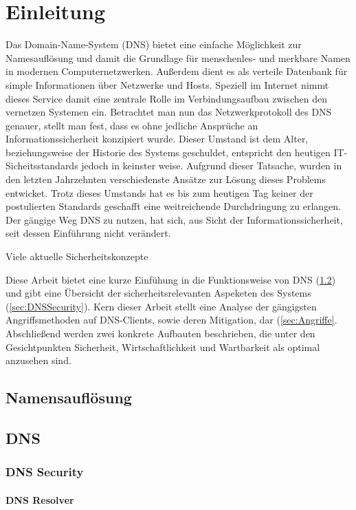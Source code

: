 \chapter{Einleitung}
Das Domain-Name-System (DNS) bietet eine einfache Möglichkeit zur Namesauflösung und damit die Grundlage für menschenles- und merkbare Namen in modernen Computernetzwerken. Außerdem dient es als verteile Datenbank für simple Informationen über Netzwerke und Hosts. Speziell im Internet nimmt dieses Service damit eine zentrale Rolle im Verbindungsaufbau zwischen den vernetzen Systemen ein. Betrachtet man nun das Netzwerkprotokoll des DNS genauer, stellt man fest, dass es ohne jedliche Ansprüche an Informationssicherheit konzipiert wurde. Dieser Umstand ist dem Alter, beziehungsweise der Historie des Systems geschuldet, entspricht den heutigen IT-Sicheitsstandards jedoch in keinster weise. Aufgrund dieser Tatsache, wurden in den letzten Jahrzehnten verschiedenste Ansätze zur Lösung dieses Problems entwicket. Trotz dieses Umstands hat es bis zum heutigen Tag keiner der postulierten Standards geschafft eine weitreichende Durchdringung zu erlangen. Der gängige Weg DNS zu nutzen, hat sich, aus Sicht der Informationssicherheit, seit dessen Einführung nicht verändert.

Viele aktuelle Sicherheitskonzepte 

Diese Arbeit bietet eine kurze Einfühung in die Funktionsweise von DNS (\ref{sec:DNS}) und gibt eine Übersicht der sicherheitsrelevanten Aspeketen des Systems (\ref{sec:DNSSecurity}). Kern dieser Arbeit stellt eine Analyse der gängigsten Angriffsmethoden auf DNS-Clients, sowie deren Mitigation, dar (\ref{sec:Angriffe}. Abschließend werden zwei konkrete Aufbauten beschrieben, die unter den Gesichtpunkten Sicherheit, Wirtschaftlichkeit und Wartbarkeit als optimal anzusehen sind. 

\section{Namensauflösung}

\section{DNS}
\label{sec:DNS}
\lipsum 

\subsection{DNS Security}
\lipsum 

\subsubsection{DNS Resolver}
\lipsum
